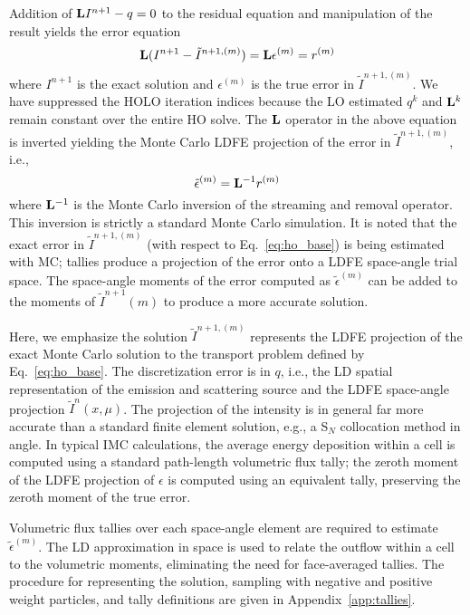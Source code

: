 Addition of $\mathbf{L} I^{n+1} - q=0$ to the residual equation 
and manipulation of the result yields the error equation
\begin{equation}\label{eq:err_eq}
    \mathbf{L} (I^{n+1} - \tilde{I}^{n+1,(m)}) = \mathbf{L} {\epsilon}^{(m)} = r^{(m)}
\end{equation}
where $I^{n+1}$ is the exact solution and ${\epsilon}^{(m)}$ is the true error in
$\tilde{I}^{n+1,(m)}$. 
We have suppressed the HOLO iteration indices because the LO estimated $q^{k}$ and $\mathbf{L}^{k}$ remain constant over the entire HO solve.
The $\mathbf{L}$ operator in the above equation is inverted yielding
the Monte Carlo LDFE projection of the error in $\tilde{I}^{n+1,(m)}$, i.e., 
\begin{equation}\label{eq:mc_err}
\tilde{\epsilon}^{(m)} = \mathbf{L}^{-1} r^{(m)}
\end{equation}
where $\mathbf{L}^{-1}$ is the Monte Carlo inversion of the streaming and removal operator.  
This inversion is strictly a standard Monte Carlo simulation.   It is noted that the exact
error in $\tilde{I}^{n+1,(m)}$ (with respect to Eq.~\eqref{eq:ho_base}) is being estimated with MC;
tallies produce a projection of the error onto a LDFE space-angle trial space. The space-angle
moments of the error computed as $\tilde{\epsilon}^{(m)}$ can be added to the
moments of $\tilde{I}^{n+1}(m)$ to produce a more accurate solution.  


Here, we emphasize the solution $\tilde{I}^{n+1,(m)}$ represents the LDFE projection of the exact Monte Carlo
solution to the transport problem defined by Eq.~\eqref{eq:ho_base}.  The discretization error is in $q$, i.e., the LD spatial
representation of the emission and scattering source and the LDFE space-angle projection $\tilde I^{n}(x,\mu)$.
 The projection of the intensity is in
general far more accurate than a standard finite element solution, e.g., a S$_N$ collocation method in angle.  In typical IMC calculations, the average
energy deposition within a cell is computed using a standard path-length volumetric
flux tally; the zeroth moment of the LDFE projection of ${\epsilon}$ is
computed using an equivalent tally, preserving the zeroth moment of the true error.

Volumetric flux tallies over each space-angle element are required to estimate
$\tilde{\epsilon}^{(m)}$.  The LD approximation in space is used to relate the
outflow within a cell to the volumetric moments, eliminating the need for
face-averaged tallies.  The procedure for representing the solution, sampling with negative and
positive weight particles, and tally
definitions are given in Appendix~\ref{app:tallies}.


